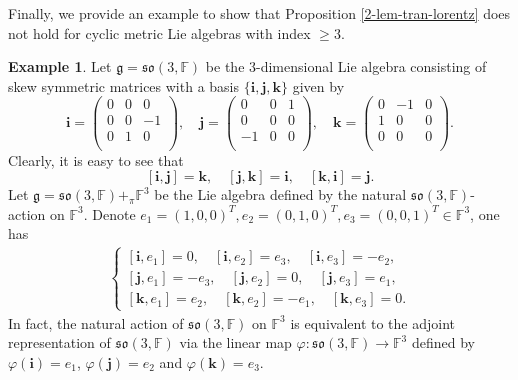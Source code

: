 \documentclass[reqno]{amsart}
\theoremstyle{definition}
\newtheorem{example}[thm]{Example}
\begin{document}
Finally, we provide an example to show that Proposition \ref{2-lem-tran-lorentz}  does not hold for cyclic metric    Lie algebras  with index $\geq3$.
\begin{example}\label{3-exam-so(3)}
Let $\mathfrak{g}=\mathfrak{so}(3,\mathbb{F})$ be the $3$-dimensional  Lie algebra consisting of skew symmetric matrices with a basis $\{\mathbf{i},\mathbf{j},\mathbf{k}\}$ given by
$$\mathbf{i}=\left(
               \begin{array}{ccc}
                 0 & 0 & 0 \\
                 0 & 0 & -1 \\
                 0 & 1 & 0 \\
               \end{array}
             \right),\quad
\mathbf{j}=\left(
               \begin{array}{ccc}
                 0 & 0 & 1 \\
                 0 & 0 & 0 \\
                 -1 & 0 & 0 \\
               \end{array}
             \right),\quad
\mathbf{k}=\left(
               \begin{array}{ccc}
                 0 & -1 & 0 \\
                 1 & 0 & 0 \\
                 0 & 0 & 0 \\
               \end{array}
             \right).$$
Clearly, it is easy to see that
$$[\mathbf{i},\mathbf{j}]=\mathbf{k},\quad [\mathbf{j},\mathbf{k}]=\mathbf{i},\quad [\mathbf{k},\mathbf{i}]=\mathbf{j}.$$
Let $\mathfrak{g}=\mathfrak{so}(3,\mathbb{F})+_{\pi}\mathbb{F}^{3}$ be the  Lie algebra defined by the natural $\mathfrak{so}(3,\mathbb{F})$-action on $\mathbb{F}^{3}$.
Denote $e_{1}=(1,0,0)^{T},e_{2}=(0,1,0)^{T}, e_{3}=(0,0,1)^{T}\in \mathbb{F}^{3}$, one has
\begin{eqnarray*}
\begin{cases}
[\mathbf{i},e_{1}]=0,\quad  [\mathbf{i},e_{2}]=e_{3},\quad [\mathbf{i},e_{3}]=-e_{2},\\
[\mathbf{j},e_{1}]=-e_{3},\quad  [\mathbf{j},e_{2}]=0,\quad [\mathbf{j},e_{3}]=e_{1},\\
[\mathbf{k},e_{1}]=e_{2},\quad  [\mathbf{k},e_{2}]=-e_{1},\quad [\mathbf{k},e_{3}]=0.
\end{cases}
\end{eqnarray*}
In fact, the natural action of $\mathfrak{so}(3,\mathbb{F})$ on $\mathbb{F}^{3}$ is equivalent to the adjoint representation of $\mathfrak{so}(3,\mathbb{F})$ via the linear map $\varphi: \mathfrak{so}(3,\mathbb{F})\rightarrow \mathbb{F}^{3}$ defined by $\varphi(\mathbf{i})=e_{1}$, $\varphi(\mathbf{j})=e_{2}$ and $\varphi(\mathbf{k})=e_{3}$.


\end{example}
\end{document}
